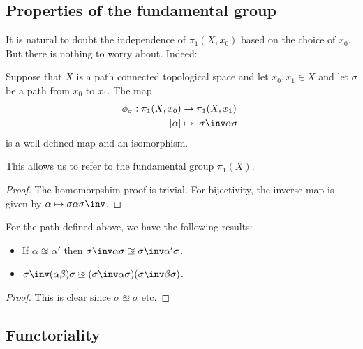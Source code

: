 \documentclass[12pt, a4paper]{article}
\begin{document}
\subsection{Properties of the fundamental group}

It is natural to doubt the independence of \(\pi_1(X, x_0)\) based on the choice of \(x_0\). But there is
nothing to worry about. Indeed:

\begin{mdprop}
    Suppose that \(X\) is a path connected topological space and let \(x_0,x_1 \in X\) and let \(\sigma\) be a path from \(x_0\) to \(x_1\). The map 
    \[\begin{aligned}
        \phi_{\sigma} :\pi_1(X,x_0) &\to \pi_1(X,x_1) \\
        [\alpha] &\mapsto [\sigma\inv\alpha\sigma]
    \end{aligned}\]
    is a well-defined map and an isomorphism.
\end{mdprop}

\begin{mdremark}
    This allows us to refer to the fundamental group \(\pi_1(X)\).
\end{mdremark}

\begin{proof}
    The homomorpshim proof is trivial. For bijectivity, the inverse map is given by \(\alpha \mapsto \sigma\alpha\sigma\inv\).
\end{proof}

\begin{lemma}
    For the path defined above, we have the following results:
    \begin{itemize}
        \item If \(\alpha \approxeq \alpha'\) then \(\sigma\inv\alpha\sigma \approxeq \sigma\inv \alpha' \sigma\).
        \item \(\sigma\inv (\alpha\beta) \sigma \approxeq (\sigma\inv \alpha\sigma)(\sigma\inv\beta\sigma)\).
    \end{itemize}
\end{lemma}

\begin{proof}
    This is clear since \(\sigma\approxeq \sigma\) etc.
\end{proof}

\subsection{Functoriality}
\end{document}
